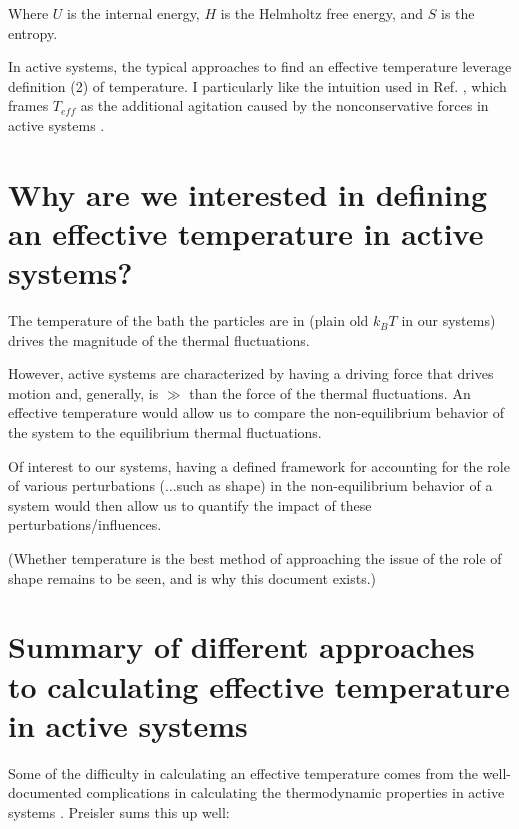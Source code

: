 \documentclass[11pt]{article}   	%
\begin{document}
Where $U$ is the internal energy, $H$ is the Helmholtz free energy, and $S$ is the entropy.

In active systems, the typical approaches to find an effective temperature leverage definition (2) of temperature. I particularly like the intuition used in Ref. \cite{LoiMossaEA_2008_PRE}, which frames $T_{eff}$ as the additional agitation caused by the nonconservative forces in active systems \cite{LoiMossaEA_2008_PRE}.



\section{Why are we interested in defining an effective temperature in active systems?}

The temperature of the bath the particles are in (plain old $k_BT$ in our systems) drives the magnitude of the thermal fluctuations.

However, active systems are characterized by having a driving force that drives motion and, generally, is $\gg$ than the force of the thermal fluctuations. An effective temperature would allow us to compare the non-equilibrium behavior of the system to the equilibrium thermal fluctuations.

Of interest to our systems, having a defined framework for accounting for the role of various perturbations (...such as shape) in the non-equilibrium behavior of a system would then allow us to quantify the impact of these perturbations/influences.

(Whether temperature is the best method of approaching the issue of the role of shape remains to be seen, and is why this document exists.)



\section{Summary of different approaches to calculating effective temperature in active systems}

Some of the difficulty in calculating an effective temperature comes from the well-documented complications in calculating the thermodynamic properties in active systems \cite{TakatoriEA_2014_PRL, SolonEA_2015_NaturePhysics, SolonEA_2015_PRL, WinklerWysockiGompper_2015_SoftMatter, TakatoriBrady_2015_PRE}. Preisler sums this up well:
\end{document}
